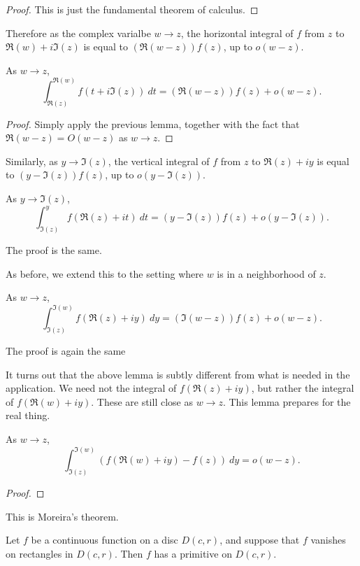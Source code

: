  \begin{proof}
 This is just the fundamental theorem of calculus.
 \end{proof}

Therefore as the complex varialbe $w \to z$, the horizontal integral of $f$ from $z$ to
$\Re(w)+i\Im(z)$ is equal to $(\Re(w - z)) f(z)$, up to $o(w - z)$.
\begin{lemma}
  \label{deriv_of_wedgeInt_re}
  \leanok
  As $w \to z$,
  $$
    \int_{\Re(z)}^{\Re(w)} f(t + i\Im(z))\ dt
    =
    (\Re(w-z)) f(z)
    +
    o(w-z)
    .
  $$
\end{lemma}

 \begin{proof}
 Simply apply the previous lemma, together with the fact that $\Re(w - z) = O(w - z)$ as $w \to z$.
 \end{proof}

Similarly, as $y \to \Im(z)$, the vertical integral of $f$ from $z$ to $\Re(z)+iy$ is equal to
$(y - \Im(z)) f(z)$, up to $o(y - \Im(z))$.
\begin{lemma}
  \label{deriv_of_wedgeInt_im'}
  \leanok
  As $y \to \Im(z)$,
  $$
    \int_{\Im(z)}^y f(\Re(z)+it)\ dt
    =
    (y-\Im(z)) f(z)
    +
    o(y-\Im(z))
    .
  $$
\end{lemma}
The proof is the same.


As before, we extend this to the setting where $w$ is in a neighborhood of $z$.
\begin{lemma}
  \label{deriv_of_wedgeInt_im''}
  \leanok
  As $w \to z$,
  $$
    \int_{\Im(z)}^{\Im(w)} f(\Re(z)+iy)\ dy
    =
    (\Im(w-z)) f(z)
    +
    o(w-z)
    .
  $$
\end{lemma}
The proof is again the same


It turns out that the above lemma is subtly different from what is needed in the application.
We need not the integral of $f(\Re(z)+iy)$, but rather the integral of $f(\Re(w)+iy)$. These are
still close as $w \to z$. This lemma prepares for the real thing.
\begin{lemma}
  \label{deriv_of_wedgeInt_im'''}
  As $w \to z$,
  $$
    \int_{\Im(z)}^{\Im(w)} (f(\Re(w)+iy) - f (z))\ dy
    =
    o(w-z)
    .
  $$
\end{lemma}

 \begin{proof}
 \end{proof}

This is Moreira's theorem.
\begin {theorem}
\label {moreira}
\leanok
Let $f$ be a continuous function on a disc $D(c,r)$, and suppose that $f$ vanishes on rectangles in $D(c,r)$. Then $f$ has a primitive on $D(c,r)$.
\end {theorem}

